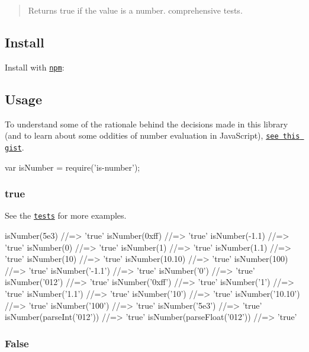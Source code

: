 \begin{quote}
Returns true if the value is a number. comprehensive tests. \end{quote}


\subsection*{Install}

Install with \href{https://www.npmjs.com/}{\tt npm}\+:




\subsection*{Usage}

To understand some of the rationale behind the decisions made in this library (and to learn about some oddities of number evaluation in Java\+Script), \href{https://gist.github.com/jonschlinkert/e30c70c713da325d0e81}{\tt see this gist}.


\begin{DoxyCode}
var isNumber = require('is-number');
\end{DoxyCode}


\subsubsection*{true}

See the \href{./test.js}{\tt tests} for more examples.


\begin{DoxyCode}
isNumber(5e3)      //=> 'true'
isNumber(0xff)     //=> 'true'
isNumber(-1.1)     //=> 'true'
isNumber(0)        //=> 'true'
isNumber(1)        //=> 'true'
isNumber(1.1)      //=> 'true'
isNumber(10)       //=> 'true'
isNumber(10.10)    //=> 'true'
isNumber(100)      //=> 'true'
isNumber('-1.1')   //=> 'true'
isNumber('0')      //=> 'true'
isNumber('012')    //=> 'true'
isNumber('0xff')   //=> 'true'
isNumber('1')      //=> 'true'
isNumber('1.1')    //=> 'true'
isNumber('10')     //=> 'true'
isNumber('10.10')  //=> 'true'
isNumber('100')    //=> 'true'
isNumber('5e3')    //=> 'true'
isNumber(parseInt('012'))   //=> 'true'
isNumber(parseFloat('012')) //=> 'true'
\end{DoxyCode}


\subsubsection*{False}

